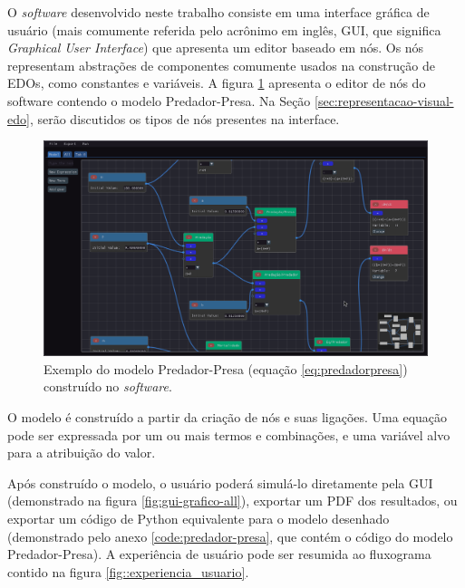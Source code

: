 \documentclass[
	12pt,				%
	openright,			%
	oneside,			%
	a4paper,			%
	main=brazil,
	english,			%
	]{ufsj-abntex2}
\begin{document}
O \textit{software} desenvolvido neste trabalho consiste em uma interface gráfica de usuário (mais comumente referida pelo acrônimo em inglês, GUI, que significa \textit{Graphical User Interface}) que apresenta um editor baseado em nós. Os nós representam abstrações de componentes comumente usados na construção de EDOs, como constantes e variáveis. A figura \ref{fig:gui-predador-presa} apresenta o editor de nós do software contendo o modelo Predador-Presa. Na Seção \ref{sec:representacao-visual-edo}, serão discutidos os tipos de nós presentes na interface.

\begin{figure}[h]
    \centering
    \includegraphics[width=\textwidth]{imgs/ode-designer/predador-presa.png} 
    \caption{Exemplo do modelo Predador-Presa (equação \ref{eq:predadorpresa}) construído no \textit{software}.}
    \label{fig:gui-predador-presa}
\end{figure}

O modelo é construído a partir da criação de nós e suas ligações. Uma equação pode ser expressada por um ou mais termos e combinações, e uma variável alvo para a atribuição do valor.

Após construído o modelo, o usuário poderá simulá-lo diretamente pela GUI (demonstrado na figura \ref{fig:gui-grafico-all}), exportar um PDF dos resultados, ou exportar um código de Python equivalente para o modelo desenhado (demonstrado pelo anexo \ref{code:predador-presa}, que contém o código do modelo Predador-Presa). A experiência de usuário pode ser resumida ao fluxograma contido na figura \ref{fig::experiencia_usuario}.
\end{document}
